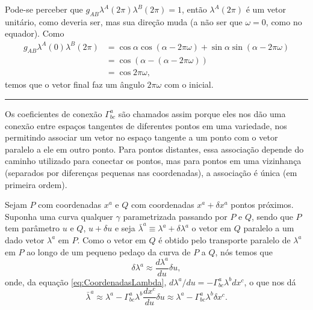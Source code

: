 \begin{exemplo}
Pode-se perceber que $g_{A B} \lambda^{A}(2 \pi) \lambda^{B}(2 \pi)=1$, então $\lambda^A(2\pi)$ é um vetor unitário, como deveria ser, mas sua direção muda (a não ser que $\omega=0$, como no equador). Como
\[
\begin{aligned} g_{A B} \lambda^{A}(0) \lambda^{B}(2 \pi) &=\cos \alpha \cos (\alpha-2 \pi \omega)+\sin \alpha \sin (\alpha-2 \pi \omega) \\ &=\cos (\alpha-(\alpha-2 \pi \omega)) \\ &=\cos 2 \pi \omega ,\end{aligned}
\]
temos que o vetor final faz um ângulo $2\pi\omega$ com o inicial.

\noindent
\rule{\textwidth}{0.4pt}
\end{exemplo}

Os coeficientes de conexão $\Gamma^a_{bc}$ são chamados assim porque eles nos dão uma conexão entre espaços tangentes de diferentes pontos em uma variedade, nos permitindo associar um vetor no espaço tangente a um ponto com o vetor paralelo a ele em outro ponto. Para pontos distantes, essa associação depende do caminho utilizado para conectar os pontos, mas para pontos em uma vizinhança (separados por diferenças pequenas nas coordenadas), a associação é única (em primeira ordem).

Sejam $P$ com coordenadas $x^a$ e $Q$ com coordenadas $x^a+\delta x^a$ pontos próximos. Suponha uma curva qualquer $\gamma$ parametrizada passando por $P$ e $Q$, sendo que $P$ tem parâmetro $u$ e $Q$, $u+\delta u$ e seja $\bar{\lambda}^a\equiv\lambda^a + \delta\lambda^a$ o vetor em $Q$ paralelo a um dado vetor $\lambda^a$ em $P$. Como o vetor em $Q$ é obtido pelo transporte paralelo de $\lambda^a$ em $P$ ao longo de um pequeno pedaço da curva de $P$ a $Q$, nós temos que 
\[
	\delta \lambda^a \approx \frac{d\lambda^a}{du}\delta u,
\] 
onde, da equação \eqref{eq:CoordenadasLambda}, $d\lambda^a/du=-\Gamma^a_{bc}\lambda^bdx^c$, o que nos dá
\begin{equation}\label{eq:AproximacaoTransporteParalelo}
	\bar{\lambda}^a \approx \lambda^a - \Gamma^a_{bc}\lambda^b \frac{dx^c}{du}\delta u \approx \lambda^a - \Gamma^a_{bc}\lambda^b\delta x^c .
\end{equation}

